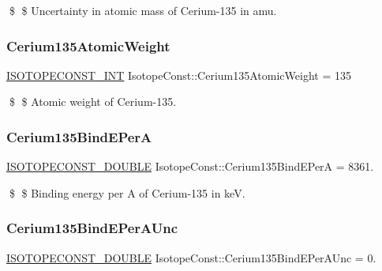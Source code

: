\$ \$ Uncertainty in atomic mass of Cerium-\/135 in amu. \mbox{\label{group___isotope_const-_cerium-_ce135_ga0b0d83fc4412c1263e239d44aeb8a5da}} 
\subsubsection{\texorpdfstring{Cerium135\+Atomic\+Weight}{Cerium135AtomicWeight}}
{\footnotesize\ttfamily \mbox{\hyperlink{group___isotope_const-_macros_ga5f18360b3e99483a35c32d789e62621c}{I\+S\+O\+T\+O\+P\+E\+C\+O\+N\+S\+T\+\_\+\+I\+NT}} Isotope\+Const\+::\+Cerium135\+Atomic\+Weight = 135}

\$ \$ Atomic weight of Cerium-\/135. \mbox{\label{group___isotope_const-_cerium-_ce135_ga8f1c2edc4d946494e7526a36c252abac}} 
\subsubsection{\texorpdfstring{Cerium135\+Bind\+E\+PerA}{Cerium135BindEPerA}}
{\footnotesize\ttfamily \mbox{\hyperlink{group___isotope_const-_macros_ga8f45a7272ce02c0b4c65c44636ed719a}{I\+S\+O\+T\+O\+P\+E\+C\+O\+N\+S\+T\+\_\+\+D\+O\+U\+B\+LE}} Isotope\+Const\+::\+Cerium135\+Bind\+E\+PerA = 8361.}

\$ \$ Binding energy per A of Cerium-\/135 in keV. \mbox{\label{group___isotope_const-_cerium-_ce135_gafa0ad898bf80834c0dd4be2909e87455}} 
\subsubsection{\texorpdfstring{Cerium135\+Bind\+E\+Per\+A\+Unc}{Cerium135BindEPerAUnc}}
{\footnotesize\ttfamily \mbox{\hyperlink{group___isotope_const-_macros_ga8f45a7272ce02c0b4c65c44636ed719a}{I\+S\+O\+T\+O\+P\+E\+C\+O\+N\+S\+T\+\_\+\+D\+O\+U\+B\+LE}} Isotope\+Const\+::\+Cerium135\+Bind\+E\+Per\+A\+Unc = 0.}

